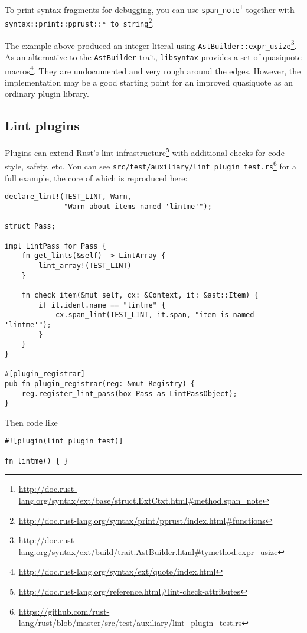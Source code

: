 \documentclass[a4paper,]{book}
\renewcommand{\href}[2]{#2\footnote{\url{#1}}}
\begin{document}
To print syntax fragments for debugging, you can use
\href{http://doc.rust-lang.org/syntax/ext/base/struct.ExtCtxt.html\#method.span_note}{\texttt{span\_note}}
together with
\href{http://doc.rust-lang.org/syntax/print/pprust/index.html\#functions}{\texttt{syntax::print::pprust::*\_to\_string}}.

The example above produced an integer literal using
\href{http://doc.rust-lang.org/syntax/ext/build/trait.AstBuilder.html\#tymethod.expr_usize}{\texttt{AstBuilder::expr\_usize}}.
As an alternative to the \texttt{AstBuilder} trait, \texttt{libsyntax}
provides a set of
\href{http://doc.rust-lang.org/syntax/ext/quote/index.html}{quasiquote
macros}. They are undocumented and very rough around the edges. However,
the implementation may be a good starting point for an improved
quasiquote as an ordinary plugin library.

\subsection{Lint plugins}\label{lint-plugins}

Plugins can extend
\href{http://doc.rust-lang.org/reference.html\#lint-check-attributes}{Rust's
lint infrastructure} with additional checks for code style, safety, etc.
You can see
\href{https://github.com/rust-lang/rust/blob/master/src/test/auxiliary/lint_plugin_test.rs}{\texttt{src/test/auxiliary/lint\_plugin\_test.rs}}
for a full example, the core of which is reproduced here:

\begin{verbatim}
declare_lint!(TEST_LINT, Warn,
              "Warn about items named 'lintme'");

struct Pass;

impl LintPass for Pass {
    fn get_lints(&self) -> LintArray {
        lint_array!(TEST_LINT)
    }

    fn check_item(&mut self, cx: &Context, it: &ast::Item) {
        if it.ident.name == "lintme" {
            cx.span_lint(TEST_LINT, it.span, "item is named 'lintme'");
        }
    }
}

#[plugin_registrar]
pub fn plugin_registrar(reg: &mut Registry) {
    reg.register_lint_pass(box Pass as LintPassObject);
}
\end{verbatim}

Then code like

\begin{verbatim}
#![plugin(lint_plugin_test)]

fn lintme() { }
\end{verbatim}
\end{document}
